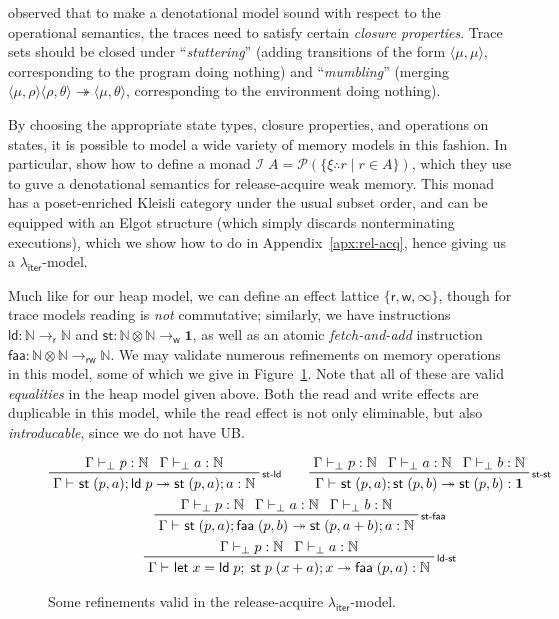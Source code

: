 \documentclass[acmsmall,screen,review]{acmart}
\newcommand{\mc}[1]{\ensuremath{\mathcal{#1}}}
\newcommand{\mb}[1]{\ensuremath{\mathbf{#1}}}
\newcommand{\ms}[1]{\ensuremath{\mathsf{#1}}}
\newcommand{\nats}{\mathbb{N}}
\newcommand{\letexpr}[3]{\ensuremath{\ms{let}\;#1 = #2;\;#3}}
\newcommand{\rle}[1]{{\scriptsize\textsf{#1}}}
\newcommand{\hasty}[4]{#1 \vdash_{#2} #3: {#4}}
\newcommand{\tref}{\twoheadrightarrow}
\newcommand{\tmle}[5]{#1 \vdash_{#2} #3 \tref #4 : {#5}}
\newcommand{\subiterexp}{\texorpdfstring{\(\lambda_{\ms{iter}}\)}{lambda-iter}}
\newcommand{\tret}[2]{#1 \therefore #2}
\begin{document}
\citet{brookes-full-abstraction-96} observed that to make a denotational model sound with respect to
the operational semantics, the traces need to satisfy certain \emph{closure properties}. Trace sets
should be closed under ``\emph{stuttering}'' (adding transitions of the form $\langle \mu, \mu
\rangle$, corresponding to the program doing nothing) and ``\emph{mumbling}'' (merging $\langle \mu,
\rho \rangle\langle \rho, \theta \rangle \tref \langle \mu, \theta \rangle$, corresponding to the
environment doing nothing).

By choosing the appropriate state types, closure properties, and operations on states, it is
possible to model a wide variety of memory models in this fashion. In particular,
\citet{release-acquire} show how to define a monad $\mc{I}\;A = \mc{P}(\{\tret{\xi}{r} \mid r \in
A\})$, which they use to guve a denotational semantics for release-acquire weak memory. This monad
has a poset-enriched Kleisli category under the usual subset order, and can be equipped with an
Elgot structure (which simply discards nonterminating executions), which we show how to do in
Appendix~\ref{apx:rel-acq}, hence giving us a \subiterexp{}-model.

Much like for our heap model, we can define an effect lattice $\{\ms{r}, \ms{w}, \infty\}$, though
for trace models reading is \emph{not} commutative; similarly, we have instructions $\ms{ld}: \nats
\to_{\ms{r}} \nats$ and $\ms{st}: \nats \otimes \nats \to_{\ms{w}} \mb{1}$, as well as an atomic
\emph{fetch-and-add} instruction $\ms{faa}: \nats \otimes \nats \to_{\ms{rw}} \nats$. We may
validate numerous refinements on memory operations in this model, some of which we give in
Figure~\ref{fig:weak-refinements}. Note that all of these are valid \emph{equalities} in the heap
model given above. Both the read and write effects are duplicable in this model, while the read
effect is not only eliminable, but also \emph{introducable}, since we do not have UB.

\begin{figure}
  \begin{gather*}
    \prftree[r]{\rle{st-ld}}
      {\hasty{\Gamma}{\bot}{p}{\nats}}
      {\hasty{\Gamma}{\bot}{a}{\nats}}
      {\tmle{\Gamma}{}{\ms{st}\;(p, a) ; \ms{ld}\;p}{\ms{st}\;(p, a) ; a}{\nats}}
      \qquad
    \prftree[r]{\rle{st-st}}
      {\hasty{\Gamma}{\bot}{p}{\nats}}
      {\hasty{\Gamma}{\bot}{a}{\nats}}
      {\hasty{\Gamma}{\bot}{b}{\nats}}
      {\tmle{\Gamma}{}{\ms{st}\;(p, a) ; \ms{st}\;(p, b)}{\ms{st}\;(p, b)}{\mb{1}}}
    \\
    \prftree[r]{\rle{st-faa}}
      {\hasty{\Gamma}{\bot}{p}{\nats}}
      {\hasty{\Gamma}{\bot}{a}{\nats}}
      {\hasty{\Gamma}{\bot}{b}{\nats}}
      {\tmle{\Gamma}{}{\ms{st}\;(p, a) ; \ms{faa}\;(p, b)}{\ms{st}\;(p, a + b) ; a}{\nats}}
    \\
    \prftree[r]{\rle{ld-st}}
      {\hasty{\Gamma}{\bot}{p}{\nats}}
      {\hasty{\Gamma}{\bot}{a}{\nats}}
      {\tmle{\Gamma}{}{\letexpr{x}{\ms{ld}\;p}{\ms{st}\;p\;(x + a) ; x}}{\ms{faa}\;(p, a)}{\nats}}
  \end{gather*}
  \caption{Some refinements valid in the release-acquire \subiterexp{}-model.}
  \label{fig:weak-refinements}
  \Description{}
\end{figure}
\end{document}
